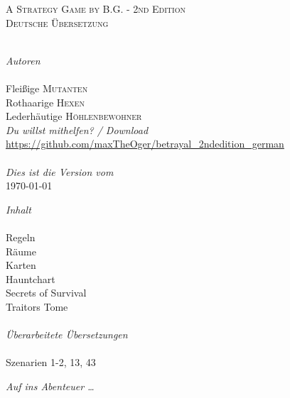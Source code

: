 \begin{titlepage}
\begin{center}
\textsc{A Strategy Game by B.G. - 2nd Edition}\\[1.5cm]

\textsc{\Large Deutsche Übersetzung}\\[0.5cm]



\HRule \\[1.5cm]

\begin{minipage}{0.4\textwidth}
\begin{flushleft} \large
\emph{Autoren}\\
\\[0.3cm]
Fleißige \textsc{Mutanten}\\
Rothaarige \textsc{Hexen}\\
Lederhäutige \textsc{Höhlenbewohner}
\\[1.5cm]
\emph{Du willst mithelfen? / Download}
\\[0.3cm]
\url{https://github.com/maxTheOger/betrayal\_2ndedition\_german}\\
\\[1.5cm]
\emph{Dies ist die Version vom}
\\[0.3cm]
{\large \today}


\end{flushleft}
\end{minipage}
\hfill
\begin{minipage}{0.4\textwidth}
\begin{flushright} \large
\emph{Inhalt} \\
\\[0.3cm]
Regeln \\
Räume \\
Karten \\
Hauntchart \\
Secrets of Survival \\
Traitors Tome \\
\\[1.5cm]
\emph{Überarbeitete Übersetzungen}\\
\\[0.3cm]
Szenarien 1-2, 13, 43
\end{flushright}
\end{minipage}

\vfill

{\emph{Auf ins Abenteuer …}}

\end{center}

\end{titlepage}